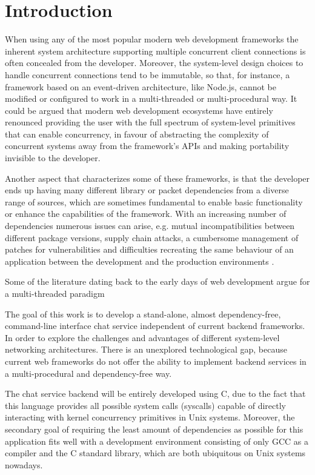 \section{Introduction}
When using any of the most popular modern web development frameworks the inherent system architecture supporting multiple concurrent client connections is often concealed from the developer. Moreover, the system-level design choices to handle concurrent connections tend to be immutable, so that, for instance, a framework based on an event-driven architecture, like Node.js, cannot be modified or configured to work in a multi-threaded or multi-procedural way. It could be argued that modern web development ecosystems have entirely renounced providing the user with the full spectrum of system-level primitives that can enable concurrency, in favour of abstracting the complexity of concurrent systems away from the framework's APIs and making portability invisible to the developer.

Another aspect that characterizes some of these frameworks, is that the developer ends up having many different library or packet dependencies from a diverse range of sources, which are sometimes fundamental to enable basic functionality or enhance the capabilities of the framework. With an increasing number of dependencies numerous issues can arise, e.g. mutual incompatibilities between different package versions, supply chain attacks, a cumbersome management of patches for vulnerabilities and difficulties recreating the same behaviour of an application between the development and the production environments \cite{2012PoulHenning}. 

Some of the literature dating back to the early days of web development argue for a multi-threaded paradigm

\cite{2005Threads} \cite{2013ContextSwitching}\cite{2003Events}

The goal of this work is to develop a stand-alone, almost dependency-free, command-line interface chat service independent of current backend frameworks. In order to explore the challenges and advantages of different system-level networking architectures. There is an unexplored technological gap, because current web frameworks do not offer the ability to implement backend services in a multi-procedural and dependency-free way. 

The chat service backend will be entirely developed using C, due to the fact that this language provides all possible system calls (syscalls) capable of directly interacting with kernel concurrency primitives in Unix systems. Moreover, the secondary goal of requiring the least amount of dependencies as possible for this application fits well with a development environment consisting of only GCC as a compiler and the C standard library, which are both ubiquitous on Unix systems nowadays. 

